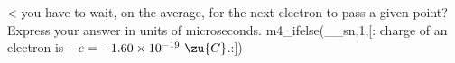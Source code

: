 <%
you have to wait, on the average, for the next electron to
pass a given point? Express your answer in units of microseconds.
m4_ifelse(__sn,1,[:%
charge of an electron is $-e=-1.60\times10^{-19}\ \zu{C}$.:])
\answercheck
